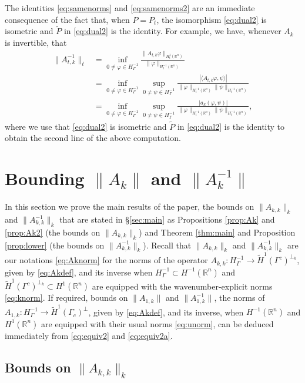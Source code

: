 \documentclass{birkjour}
\theoremstyle{definition}
\theoremstyle{remark}
\numberwithin{equation}{section}
\newcommand{\R}{\mathbb{R}}
\begin{document}
The identities \eqref{eq:samenorms} and \eqref{eq:samenorms2} are an immediate consequence of the fact that, when $P=P_t$, the isomorphism  \eqref{eq:dual2} is isometric and  $\widetilde P$ in \eqref{eq:dual2} is the identity. For example, we have, whenever $A_k$ is invertible, that
\begin{align*}
\|A_{t,k}^{-1}\|_t &= \inf_{0\neq\varphi\in H_\Gamma^{-1}}  \frac{\|A_{t,k}\varphi\|_{H^1_t(\R^n)}}{\|\varphi\|_{H^{-1}_t(\R^n)}}\\
& = \inf_{0\neq\varphi\in H_\Gamma^{-1}} \sup_{0\neq\psi\in H_\Gamma^{-1}}  \frac{|\langle A_{t,k}\varphi,\psi \rangle|}{\|\varphi\|_{H^{-1}_t(\R^n)}\|\psi\|_{H^{-1}_t(\R^n)}}\\
& = \inf_{0\neq\varphi\in H_\Gamma^{-1}} \sup_{0\neq\psi\in H_\Gamma^{-1}}  \frac{|a_k(\varphi,\psi)|}{\|\varphi\|_{H^{-1}_t(\R^n)}\|\psi\|_{H^{-1}_t(\R^n)}},
\end{align*}
where we use that \eqref{eq:dual2} is isometric and  $\widetilde P$ in \eqref{eq:dual2} is the identity to obtain the second line of the above computation.



\section{Bounding $\|A_k\|$ and $\|A_k^{-1}\|$} \label{sec:main1}

In this section we prove the main results of the paper, the bounds on $\|A_{k,k}\|_k$ and $\|A_{k,k}^{-1}\|_k$ that are stated in \S\ref{sec:main} as Propositions \ref{prop:Ak} and \ref{prop:Ak2} (the bounds on $\|A_{k,k}\|_k$) and Theorem \ref{thm:main} and Proposition \ref{prop:lower} (the bounds on $\|A_{k,k}^{-1}\|_k$). Recall that $\|A_{k,k}\|_k$ and $\|A_{k,k}^{-1}\|_k$ are our notations \eqref{eq:Aknorm} for the norms of the operator $A_{k,k}:H^{-1}_\Gamma\to \widetilde H^1(\Gamma^c)^{\perp_k}$, given by \eqref{eq:Akdef}, and its inverse when $H^{-1}_\Gamma \subset H^{-1}(\R^n)$ and $\widetilde H^1(\Gamma^c)^{\perp_k} \subset H^1(\R^n)$ are equipped with the wavenumber-explicit norms \eqref{eq:knorm}. If required, bounds on $\|A_{1,k}\|$ and $\|A_{1,k}^{-1}\|$, the norms of $A_{1,k}:H^{-1}_\Gamma \to \widetilde H^1(\Gamma_c)^\perp$, given by \eqref{eq:Akdef}, and its inverse, when  $H^{-1}(\R^n)$ and $H^1(\R^n)$ are equipped with their usual norms \eqref{eq:unorm}, can be deduced immediately from \eqref{eq:equiv2} and \eqref{eq:equiv2a}.

\subsection{Bounds on $\|A_{k,k}\|_k$} \label{sec:Akbound}
\end{document}
